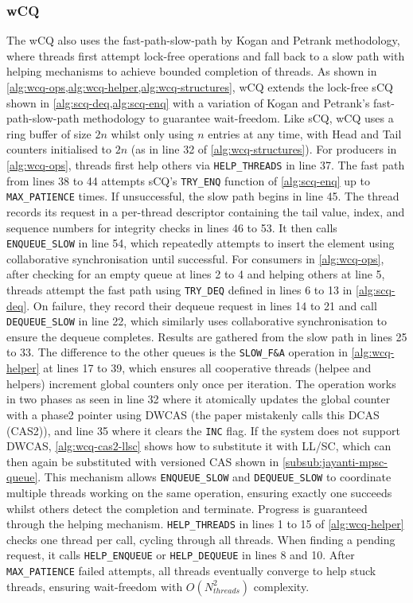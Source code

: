 \subsubsection{\acf{wCQ}}\label{subsubsec:wcq}
The \ac{wCQ} also uses the fast-path-slow-path by Kogan and Petrank methodology, where threads first attempt lock-free operations and fall back to a slow path with helping mechanisms to achieve bounded completion of threads. As shown in \cref{alg:wcq-ops,alg:wcq-helper,alg:wcq-structures}, \ac{wCQ} extends the lock-free \ac{sCQ} shown in \cref{alg:scq-deq,alg:scq-enq} with a variation of Kogan and Petrank's fast-path-slow-path methodology to guarantee wait-freedom. Like \ac{sCQ}, \ac{wCQ} uses a ring buffer of size $2n$ whilst only using $n$ entries at any time, with Head and Tail counters initialised to $2n$ (as in line 32 of \cref{alg:wcq-structures}). For producers in \cref{alg:wcq-ops}, threads first help others via \texttt{HELP\_THREADS} in line 37. The fast path from lines 38 to 44 attempts \ac{sCQ}'s \texttt{TRY\_ENQ} function of \cref{alg:scq-enq} up to \texttt{MAX\_PATIENCE} times. If unsuccessful, the slow path begins in line 45. The thread records its request in a per-thread descriptor containing the tail value, index, and sequence numbers for integrity checks in lines 46 to 53. It then calls \texttt{ENQUEUE\_SLOW} in line 54, which repeatedly attempts to insert the element using collaborative synchronisation until successful. For consumers in \cref{alg:wcq-ops}, after checking for an empty queue at lines 2 to 4 and helping others at line 5, threads attempt the fast path using \texttt{TRY\_DEQ} defined in lines 6 to 13 in \cref{alg:scq-deq}. On failure, they record their dequeue request in lines 14 to 21 and call \texttt{DEQUEUE\_SLOW} in line 22, which similarly uses collaborative synchronisation to ensure the dequeue completes. Results are gathered from the slow path in lines 25 to 33. The difference to the other queues is the \texttt{SLOW\_F\&A} operation in \cref{alg:wcq-helper} at lines 17 to 39, which ensures all cooperative threads (helpee and helpers) increment global counters only once per iteration. The operation works in two phases as seen in line 32 where it atomically updates the global counter with a phase2 pointer using \ac{DWCAS} (the paper mistakenly calls this \ac{DCAS} (CAS2)), and line 35 where it clears the \texttt{INC} flag. If the system does not support \ac{DWCAS}, \cref{alg:wcq-cas2-llsc} shows how to substitute it with \ac{LL/SC}, which can then again be substituted with versioned \ac{CAS} shown in \cref{subsub:jayanti-mpsc-queue}. This mechanism allows \texttt{ENQUEUE\_SLOW} and \texttt{DEQUEUE\_SLOW} to coordinate multiple threads working on the same operation, ensuring exactly one succeeds whilst others detect the completion and terminate. Progress is guaranteed through the helping mechanism. \texttt{HELP\_THREADS} in lines 1 to 15 of \cref{alg:wcq-helper} checks one thread per call, cycling through all threads. When finding a pending request, it calls \texttt{HELP\_ENQUEUE} or \texttt{HELP\_DEQUEUE} in lines 8 and 10. After \texttt{MAX\_PATIENCE} failed attempts, all threads eventually converge to help stuck threads, ensuring wait-freedom with $O(N_{threads}^2)$ complexity. \cite{wCQWaitFreeQueue}

